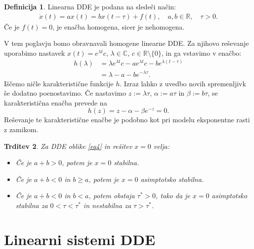 \documentclass[12pt,a4paper]{amsart}
\theoremstyle{definition} %
\newtheorem{definicija}{Definicija}[section]
\theoremstyle{plain} %
\newtheorem{trditev}[definicija]{Trditev}
\newcommand{\R}{\mathbb R}
\newcommand{\C}{\mathbb C}
\begin{document}
\begin{definicija}
    Linearna DDE je podana na sledeči način:
    \begin{equation} \label{eq4}
        \begin{split}
            \dot{x}(t)=ax(t)=bx(t-\tau)+f(t),\quad a,b\in\R, \quad \tau>0.
        \end{split}
    \end{equation}
    Če je $f(t)=0$, je enačba homogena, sicer je nehomogena. 
\end{definicija}

V tem poglavju bomo obravnavali homogene linearne DDE. Za njihovo reševanje uporabimo nastavek
$x(t)=e^{\lambda t}c$, $\lambda \in\C$, $c\in\R\setminus\{0\}$, in ga vstavimo v enačbo:
\begin{equation*}
    \begin{split}
        h(\lambda)&=\lambda e^{\lambda t}c - ae^{\lambda t}c -be^{\lambda(t-\tau)} \\
         &= \lambda - a -be^{-\lambda\tau}.
    \end{split}      
\end{equation*}
Iščemo ničle karakteristične funkcije $h$. Izraz lahko z uvedbo novih spremenljivk še dodatno 
poenostavimo. Če nastavimo $z:=\lambda\tau$, $\alpha:=a\tau$ in $\beta:=b\tau$, se karakteristična
enačba prevede na
\[h(z)=z-\alpha-\beta e^{-z}=0.\]
Reševanje te karakteristične enačbe je podobno kot pri modelu eksponentne rasti z zamikom.
\begin{trditev}
    Za DDE oblike \eqref{eq4} in rešitev $x=0$ velja:
    \begin{itemize}
        \item Če je $a+b>0$, potem je $x=0$ stabilna.
        \item Če je $a+b<0$ in $b\geq a$, potem je $x=0$ asimptotsko stabilna.
        \item Če je $a+b<0$ in $b<a$, potem obstaja $\tau^{*}>0$, tako da je $x=0$ 
        asimptotsko stabilna za $0<\tau<\tau^{*}$ in nestabilna za $\tau>\tau^{*}$.
    \end{itemize}
\end{trditev}



\section{Linearni sistemi DDE}
\end{document}
